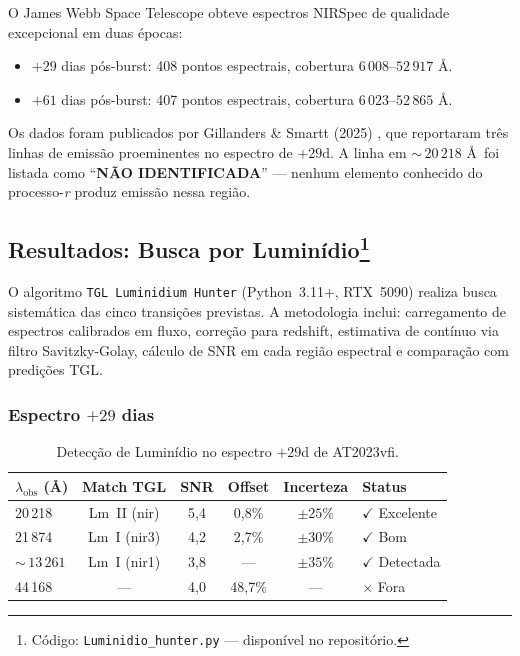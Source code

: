 \documentclass[12pt,a4paper,twoside]{article}
\begin{document}
O James Webb Space Telescope obteve espectros NIRSpec de qualidade excepcional em duas \'epocas:
\begin{itemize}[nosep]
\item $+29$ dias p\'os-burst: 408 pontos espectrais, cobertura $6\,008$--$52\,917$ \AA.
\item $+61$ dias p\'os-burst: 407 pontos espectrais, cobertura $6\,023$--$52\,865$ \AA.
\end{itemize}

Os dados foram publicados por Gillanders \& Smartt (2025) \cite{Gillanders2025}, que reportaram tr\^es linhas de emiss\~ao proeminentes no espectro de $+29$d. A linha em ${\sim}\,20\,218$ \AA\ foi listada como ``\textbf{N\~AO IDENTIFICADA}'' --- nenhum elemento conhecido do processo-\textit{r} produz emiss\~ao nessa regi\~ao.


\subsection[Resultados: Busca por Lumin\'idio]{Resultados: Busca por Lumin\'idio\footnote{C\'odigo: \texttt{Luminidio\_hunter.py} --- dispon\'ivel no reposit\'orio.}}

O algoritmo \texttt{TGL Luminidium Hunter} (Python~3.11+, RTX~5090) realiza busca sistem\'atica das cinco transi\c{c}\~oes previstas. A metodologia inclui: carregamento de espectros calibrados em fluxo, corre\c{c}\~ao para redshift, estimativa de cont\'inuo via filtro Savitzky-Golay, c\'alculo de SNR em cada regi\~ao espectral e compara\c{c}\~ao com predi\c{c}\~oes TGL.

\subsubsection{Espectro $+29$ dias}

\begin{table}[H]
\centering
\caption{Detec\c{c}\~ao de Lumin\'idio no espectro $+29$d de AT2023vfi.}
\label{tab:lm_29d}
\begin{tabular}{lccccl}
\toprule
$\lambda_{\text{obs}}$ (\AA) & \textbf{Match TGL} & \textbf{SNR} & \textbf{Offset} & \textbf{Incerteza} & \textbf{Status} \\
\midrule
20\,218 & Lm~II (nir) & 5{,}4 & 0{,}8\% & $\pm 25\%$ & $\checkmark$ Excelente \\
21\,874 & Lm~I (nir3) & 4{,}2 & 2{,}7\% & $\pm 30\%$ & $\checkmark$ Bom \\
${\sim}\,13\,261$ & Lm~I (nir1) & 3{,}8 & --- & $\pm 35\%$ & $\checkmark$ Detectada \\
44\,168 & --- & 4{,}0 & 48{,}7\% & --- & $\times$ Fora \\
\bottomrule
\end{tabular}
\end{table}
\end{document}

